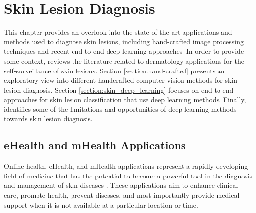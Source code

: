 \chapter{Skin Lesion Diagnosis}
\label{chapter:sota}

This chapter provides an overlook into the state-of-the-art applications and methods used to diagnose skin lesions, including hand-crafted image processing techniques and recent end-to-end deep learning approaches. In order to provide some context,  reviews the literature related to dermatology applications for the self-surveillance of skin lesions. Section \ref{section:hand-crafted} presents an exploratory view into different handcrafted computer vision methods for skin lesion diagnosis. Section \ref{section:skin_deep_learning} focuses on end-to-end approaches for skin lesion classification that use deep learning methods. Finally,  identifies some of the limitations and opportunities of deep learning methods towards skin lesion diagnosis.

\section{eHealth and mHealth Applications}
\label{section:ehealth_mhealth}
    Online health, eHealth, and mHealth applications represent a rapidly developing field of medicine that has the potential to become a powerful tool in the diagnosis and management of skin diseases \cite{Jaworek-Korjakowska2018}. These applications aim to enhance clinical care, promote health, prevent diseases, and most importantly provide medical support when it is not available at a particular location or time. \par
    
